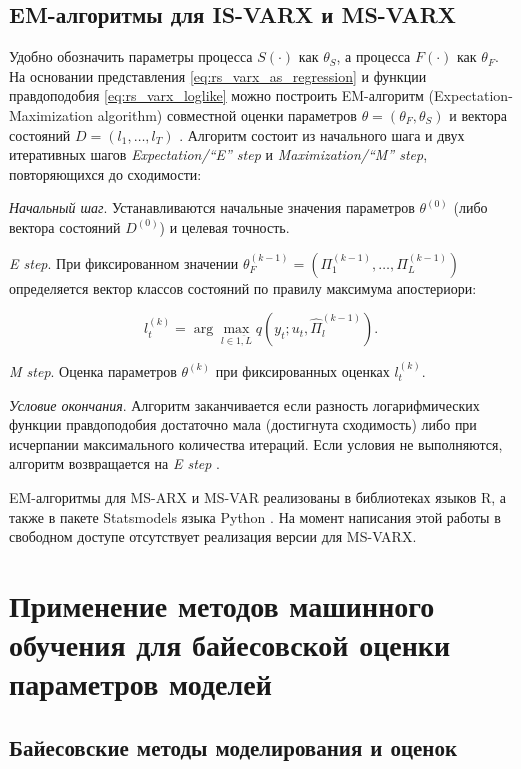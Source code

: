 \documentclass[a4paper,14pt]{extreport}
\begin{document}
\section{EM-алгоритмы для IS-VARX и MS-VARX}

Удобно обозначить параметры процесса $S(\cdot)$ как $\theta_S$, а процесса $F(\cdot)$ как $\theta_F$. На основании представления \eqref{eq:rs_varx_as_regression} и функции правдоподобия \eqref{eq:rs_varx_loglike} можно построить EM-алгоритм (Expectation-Maximization algorithm) совместной оценки параметров $\theta = (\theta_F, \theta_S)$ и вектора состояний $D = (l_1, \dots, l_T)$ \cite{malNovopMSVARX}. Алгоритм состоит из начального шага и двух итеративных шагов \textit{Expectation/``E''  step} и \textit{Maximization/``M'' step}, повторяющихся до сходимости:

\textit{Начальный шаг}. Устанавливаются начальные значения параметров $\theta^{(0)}$ (либо вектора состояний $D^{(0)}$) и целевая точность.

\textit{E step}. При фиксированном значении $\theta_F^{(k-1)}  = (\Pi_1^{(k-1)}, \dots, \Pi_L^{(k-1)})$ определяется вектор классов состояний по правилу максимума апостериори: 

\begin{equation}
	l_t^{(k)} = \arg\max_{l\in\overline{1,L}}
	q(y_t; u_t, \hat{\Pi}_{l}^{(k-1)}) .
\end{equation}

\textit{M step}. Оценка параметров $\theta^{(k)}$ при фиксированных оценках $l_t^{(k)}$.

\textit{Условие окончания}. Алгоритм заканчивается если разность логарифмических функции правдоподобия достаточно мала (достигнута сходимость) либо при исчерпании максимального количества итераций. Если условия не выполняются, алгоритм возвращается на \textit{E step} \cite{malNovopMSVARX,malVARforCycles}.

EM-алгоритмы для MS-ARX и MS-VAR реализованы в библиотеках языков R, а также в пакете Statsmodels языка Python \cite{statsmodels}. На момент написания этой работы в свободном доступе отсутствует реализация версии для MS-VARX.


\chapter{Применение методов машинного обучения для байесовской оценки параметров моделей}

\label{chapter:ml_methods}

\section{Байесовские методы моделирования и оценок}
\end{document}
